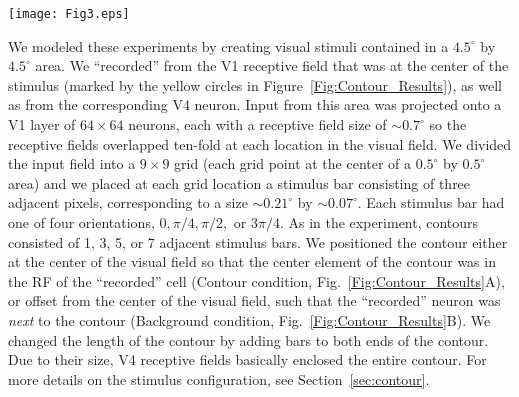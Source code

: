 \begin{figure*}[t!]
\begin{center}
\texttt{[image: Fig3.eps]}
\end{center}
\caption{Normalized V1 $E$ cell and V4 $G_c$ cell population responses
 to contours of varying lengths in either the contour (A) or the background (B)
condition. In (A), the ``recorded'' neuron is on the contour; in
(B), it is offset from the contour. The top row shows stimuli, the
second and third rows show activity in model areas 
V1 and V4, respectively. Yellow circles mark the RFs of the V1 neurons whose activity is shown in Figure~\ref{Fig:Neural_responses}.
Activity from model area V2 is not shown because a single contour does
not produce clear border ownership selectivity, and the activity in V2
is essentially the same as that in V1, but with reduced spatial
resolution due to the lower number of neurons.  
Columns in each condition show, from left to right, increasing
contour length, with the right-most column showing a jittered stimulus
configuration (see text). Neural activity is color coded
and normalized to the 7-bar stimulus in both contour and background conditions,
with warmer colors representing higher activity (see color bar at right).
To avoid unbalanced inputs near the boundaries of the visual field we use periodic boundary
conditions. We crop this and all other maps of population activity by one pixel on each
side to remove artifacts related to using periodic boundary conditions.
}
\label{Fig:Contour_Results}
\end{figure*}

We modeled these experiments by creating visual stimuli contained in a
$4.5^{\circ}$ by $4.5^{\circ}$ area. We ``recorded'' from the V1 receptive
field that was at the center of the stimulus (marked by the yellow
circles in Figure~\ref{Fig:Contour_Results}), as well as from the
corresponding V4 neuron. Input from this
area was projected onto a V1 layer of $64 \times 64$
neurons, each with a receptive field size of $\sim0.7^{\circ}$ so the
receptive fields overlapped ten-fold at each location in the visual
field.  We divided the input field into a $9 \times 9$ grid (each grid
point at the center of a $0.5^{\circ}$ by $0.5^{\circ}$ area) and we
placed at each grid location a stimulus bar 
consisting of three adjacent pixels, corresponding to a size
$\sim0.21^{\circ}$ by $\sim0.07^{\circ}$. 
Each stimulus bar had one of four orientations, $0, \pi/4, \pi/2,$ or
$3\pi/4$.  As in the \cite{Chen_etal14} experiment, contours consisted of 1, 3, 5, or 7 adjacent
stimulus bars. We positioned the contour either 
at the center of the visual field so that the center element of the contour was in the RF of the
``recorded'' cell (Contour condition,
Fig.~\ref{Fig:Contour_Results}A), or offset from the center of the
visual field, such that the ``recorded'' neuron was {\em next} to the
contour (Background condition, Fig.~\ref{Fig:Contour_Results}B).
We changed the length of the contour by adding bars
to both ends of the contour. Due to their size, V4 receptive fields basically enclosed the entire
contour. For more details on the stimulus configuration, see Section~\ref{sec:contour}.

